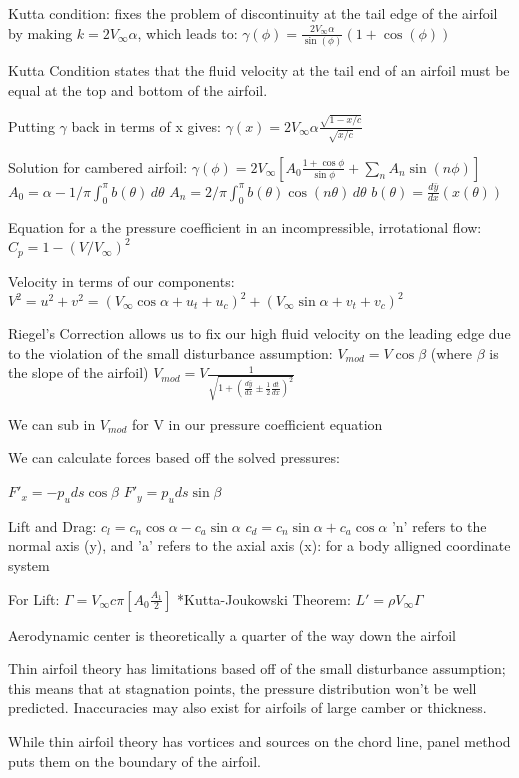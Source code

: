 \documentclass[12pt, letterpaper]{article}
\begin{document}
Kutta condition: fixes the problem of discontinuity at the tail edge of the airfoil by making $k = 2V_\infty\alpha$, which leads to:
$\gamma(\phi) = \frac{2V_\infty\alpha}{\sin(\phi)} (1+\cos(\phi))$

Kutta Condition states that the fluid velocity at the tail end of an airfoil must be equal at the top and bottom of the airfoil.

Putting $\gamma$ back in terms of x gives:
$\gamma(x) = 2V_\infty\alpha\frac{\sqrt{1-x/c}}{\sqrt{x/c}}$

Solution for cambered airfoil:
$\gamma(\phi) = 2V_\infty[A_0\frac{1+\cos\phi}{\sin\phi}+\sum_{n} A_n\sin(n\phi)]$
$A_0 = \alpha-1/\pi\int_{0}^{\pi} b(\theta)\, d\theta$
$A_n = 2/\pi\int_{0}^{\pi} b(\theta)\cos(n\theta)\, d\theta$
$b(\theta) = \frac{d\bar{y}}{dx}(x(\theta))$

Equation for a the pressure coefficient in an incompressible, irrotational flow:
$C_p = 1-(V/V_\infty)^2$

Velocity in terms of our components:
$V^2=u^2+v^2=(V_\infty\cos\alpha+u_t+u_c)^2+(V_\infty\sin\alpha+v_t+v_c)^2$ 

Riegel's Correction allows us to fix our high fluid velocity on the leading edge due to the violation of the small disturbance assumption:
$V_{mod}= V\cos\beta$ (where $\beta$ is the slope of the airfoil)
$V_{mod} = V\frac{1}{\sqrt{1+(\frac{d\bar{y}}{dx}\pm\frac{1}{2}\frac{dt}{dx})^2}}$

We can sub in $V_{mod}$ for V in our pressure coefficient equation

We can calculate forces based off the solved pressures:

$F'_x = -p_{u}ds\cos\beta$
$F'_y = p_{u}ds\sin\beta$

Lift and Drag:
$c_l=c_n\cos\alpha -c_a\sin\alpha$
$c_d = c_n\sin\alpha + c_a\cos\alpha$
'n' refers to the normal axis (y), and 'a' refers to the axial axis (x): for a body alligned coordinate system

For Lift:
$\Gamma=V_\infty c\pi[A_0 \frac{A_1}{2}]$
*Kutta-Joukowski Theorem:
$L'=\rho V_\infty \Gamma$

Aerodynamic center is theoretically a quarter of the way down the airfoil

Thin airfoil theory has limitations based off of the small disturbance assumption; this means that at stagnation points, the pressure distribution won't be
well predicted. Inaccuracies may also exist for airfoils of large camber or thickness.

While thin airfoil theory has vortices and sources on the chord line, panel method puts them on the boundary of the airfoil.
\end{document}
